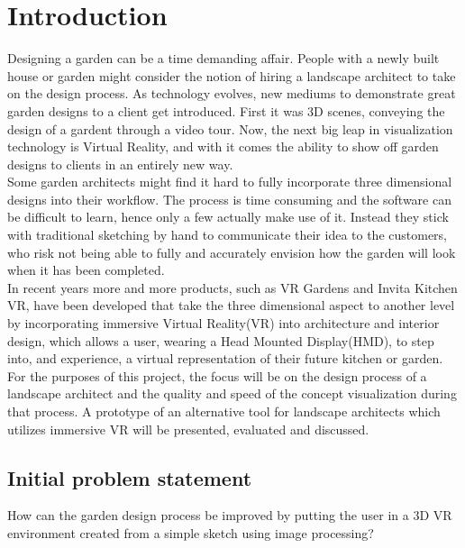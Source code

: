 \chapter{Introduction}
	Designing a garden can be a time demanding affair. People with a newly built house or garden might consider the notion of hiring a landscape architect to take on the design process. As technology evolves, new mediums to demonstrate great garden designs to a client get introduced\cite{landscapeArchitectureDigiTech}. First it was 3D scenes, conveying the design of a gardent through a video tour. Now, the next big leap in visualization technology is Virtual Reality\cite{VRS}, and with it comes the ability to show off garden designs to clients in an entirely new way.\\
	
	Some garden architects might find it hard to fully incorporate three dimensional designs into their workflow. The process is time consuming and the software can be difficult to learn, hence only a few actually make use of it. Instead they stick with traditional sketching by hand to communicate their idea to the customers, who risk not being able to fully and accurately envision how the garden will look when it has been completed.\\
	
	In recent years more and more products, such as VR Gardens and Invita Kitchen VR, have been developed that take the three dimensional aspect to another level by incorporating immersive Virtual Reality(VR) into architecture and interior design, which allows a user, wearing a Head Mounted Display(HMD), to step into, and experience, a virtual representation of their future kitchen or garden.\\
	
	For the purposes of this project, the focus will be on the design process of a landscape architect and the quality and speed of the concept visualization during that process. A prototype of an alternative tool for landscape architects which utilizes immersive VR will be presented, evaluated and discussed.
	
	
	\section{Initial problem statement}
	How can the garden design process be improved by putting the user in a 3D VR environment created from a simple sketch using image processing?
	